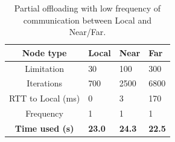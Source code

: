 \begin{table}[h!]
    \centering
    \begin{tabular}[c]{|c||p{2cm}|p{2cm}|p{2cm}|}
        \hline
        Node type & Local & Near & Far \\
        \hline
        Limitation          & 30 & 100 & 300  \\
        \hline
        Iterations          & 700 & 2500 & 6800 \\
        \hline
        RTT to Local (ms)   & 0 & 3 & 170 \\
        \hline
        Frequency           & 1 & 1 & 1 \\
        \hline
        \hline
        \hline
        \textbf{Time used (s)}       & \textbf{23.0} & \textbf{24.3} & \textbf{22.5} \\
        \hline
    \end{tabular}
    \caption{Partial offloading with low frequency of communication between Local and Near/Far.}
    \label{tab:Cloudlet_full_offloading_low_frequency}
\end{table}




